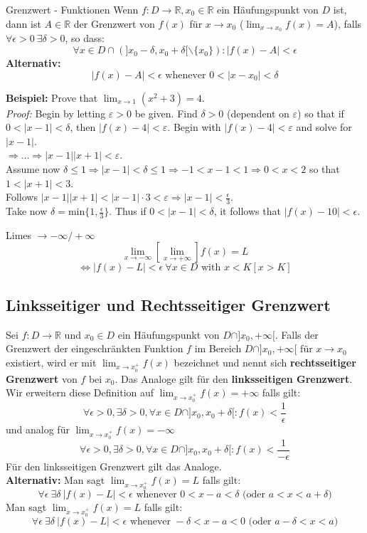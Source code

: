 \documentclass[a4paper,8pt]{extarticle}
\def\R{\mathbb{R}}
\begin{document}
\begin{mainbox}{Grenzwert - Funktionen}
 Wenn $f: D \to \R, x_0 \in \R$ ein Häufungspunkt von $D$ ist, dann ist $A \in \R$ der Grenzwert von $f(x)$ für $x \to x_0$ ($\lim_{x\to x_0} f(x) = A$), falls $\forall \epsilon > 0 \ \exists \delta > 0$, so dass: $$\forall x \in D \cap (]x_0 - \delta, x_0 + \delta[ \backslash \{x_0\}): |f(x) - A| < \epsilon$$
 \textbf{Alternativ:} $$|f(x) - A| < \epsilon \text{ whenever } 0 < |x - x_0| < \delta$$
\end{mainbox}
\noindent\textbf{Beispiel:}
Prove that $\lim_{x \to 1} (x^2 + 3) = 4$.\\
\textit{Proof:} Begin by letting $\varepsilon > 0$ be given. Find $\delta > 0$ (dependent on $\varepsilon$) so that if $0 < |x - 1| < \delta$, then $|f(x) - 4| < \varepsilon$. Begin with $|f(x) - 4| < \varepsilon$ and solve for $|x - 1|$.\\
$\Rightarrow \ldots \Rightarrow |x-1||x+1| < \varepsilon$.\\
Assume now $\delta \leq 1 \Rightarrow |x - 1| < \delta \leq 1 \Rightarrow -1 < x-1 < 1 \Rightarrow 0 < x < 2$ so that $1 < |x+1| < 3$. \\
Follows $|x-1||x+1| < |x-1| \cdot 3 < \varepsilon \Rightarrow |x-1| < \frac{\epsilon}{3}$. \\
Take now $\delta = \text{min} \{ 1, \frac{\epsilon}{3} \}$. Thus if $0 < |x - 1| < \delta$, it follows that $|f(x) - 10| < \epsilon$.
\begin{subbox}{Limes $\to -\infty / +\infty$}
  $$\lim_{x \to -\infty} [\lim_{x \to +\infty}] f(x) = L$$
  $$\Leftrightarrow |f(x) - L| < \epsilon \ \forall x \in D \text{ with } x < K [x > K]$$
\end{subbox}

\subsection{Linksseitiger und Rechtsseitiger Grenzwert}
Sei $f: D \to \R$ und $x_0 \in D$ ein Häufungspunkt von $D \cap ]x_0, +\infty[$. Falls der Grenzwert der eingeschränkten Funktion $f$ im Bereich $D \cap ]x_0, +\infty[$ für $x \to x_0$ existiert, wird er mit $\lim_{x\to x_0^+}f(x)$ bezeichnet und nennt sich \textbf{rechtsseitiger Grenzwert} von $f$ bei $x_0$. Das Analoge gilt für den \textbf{linksseitigen Grenzwert}. \\
Wir erweitern diese Definition auf $\lim_{x\to x_0^+}f(x) = + \infty$ falls gilt: $$\forall \epsilon > 0, \exists \delta > 0, \forall x \in D \cap ]x_0, x_0 + \delta[: f(x) < \frac{1}{\epsilon}$$
und analog für $\lim_{x\to x_0^+}f(x) = - \infty$ $$\forall \epsilon > 0, \exists \delta > 0, \forall x \in D \cap ]x_0, x_0 + \delta[: f(x) < \frac{1}{-\epsilon}$$
Für den linksseitigen Grenzwert gilt das Analoge. \\
\textbf{Alternativ:} Man sagt $\lim_{x \to x_0^+} f(x) = L$ falls gilt: $$\forall \epsilon \ \exists \delta \ |f(x) - L| < \epsilon \text{ whenever } 0 < x - a < \delta \text{ (oder } a < x  < a + \delta )$$
Man sagt $\lim_{x \to x_0^+} f(x) = L$ falls gilt: $$\forall \epsilon \ \exists \delta \ |f(x) - L| < \epsilon \text{ whenever } -\delta < x - a < 0 \text{ (oder } a - \delta < x  < a )$$
\end{document}
